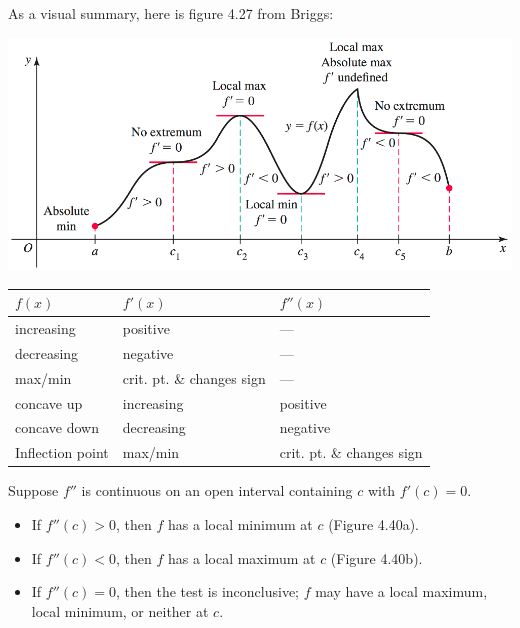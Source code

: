 \documentclass[mathNotesPreamble]{subfiles}
\begin{document}
As a visual summary, here is figure 4.27 from Briggs:
\begin{center}
  \includegraphics[width=0.85\linewidth]{images/briggs_04_03/fig4_27.png}
\end{center}
\begin{center}
  \begin{tabularx}{0.95\linewidth}{*{3}{X}}\toprule
    $f(x)$& $f'(x)$& $f''(x)$\\\midrule
    increasing& positive& ---\\
    decreasing& negative& ---\\
    max/min& crit. pt. \& changes sign& ---\\
    concave up& increasing& positive\\
    concave down& decreasing& negative\\
    Inflection point& max/min& crit. pt. \& changes sign\\\bottomrule
  \end{tabularx}
\end{center}
\pagebreak

\begin{thmBox*}
  Suppose $f''$ is continuous on an open interval containing $c$ with $f'(c)=0$.
  \begin{itemize}
    \item If $f''(c)>0$, then $f$ has a local minimum at $c$ (Figure 4.40a).
    \item If $f''(c)<0$, then $f$ has a local maximum at $c$  (Figure 4.40b).
    \item If $f''(c)=0$, then the test is inconclusive; $f$ may have a local maximum, local minimum, or neither at $c$.
  \end{itemize}
\end{thmBox*}
\end{document}
